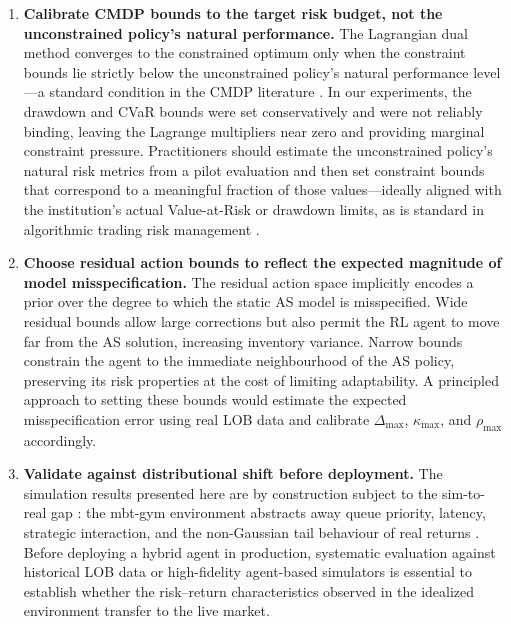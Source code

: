 \documentclass[11pt]{article}
\begin{document}
\begin{enumerate}[leftmargin=*, itemsep=6pt]
  \item \textbf{Calibrate CMDP bounds to the target risk budget, not
    the unconstrained policy's natural performance.}
    The Lagrangian dual method converges to the constrained optimum only
    when the constraint bounds lie strictly below the unconstrained
    policy's natural performance level---a standard condition in the
    CMDP literature \parencite{altschuler2024multi}.
    In our experiments, the drawdown and CVaR bounds were set
    conservatively and were not reliably binding, leaving the Lagrange
    multipliers near zero and providing marginal constraint pressure.
    Practitioners should estimate the unconstrained policy's natural
    risk metrics from a pilot evaluation and then set constraint bounds
    that correspond to a meaningful fraction of those values---ideally
    aligned with the institution's actual Value-at-Risk or drawdown limits,
    as is standard in algorithmic trading risk management
    \parencite{cartea2015execution}.

  \item \textbf{Choose residual action bounds to reflect the expected
    magnitude of model misspecification.}
    The residual action space implicitly encodes a prior over the degree
    to which the static AS model is misspecified.
    Wide residual bounds allow large corrections but also permit the RL
    agent to move far from the AS solution, increasing inventory variance.
    Narrow bounds constrain the agent to the immediate neighbourhood of
    the AS policy, preserving its risk properties at the cost of limiting
    adaptability.
    A principled approach to setting these bounds would estimate the
    expected misspecification error using real LOB data
    \parencite{lobsterdata,lobbench2025} and calibrate $\Delta_{\max}$,
    $\kappa_{\max}$, and $\rho_{\max}$ accordingly.

  \item \textbf{Validate against distributional shift before deployment.}
    The simulation results presented here are by construction subject to
    the sim-to-real gap \parencite{jerome2023mbtgym}: the mbt-gym
    environment abstracts away queue priority, latency, strategic
    interaction, and the non-Gaussian tail behaviour of real returns
    \parencite{bouchaud2018trades,cont2010stochastic}.
    Before deploying a hybrid agent in production, systematic evaluation
    against historical LOB data or high-fidelity agent-based simulators
    \parencite{byrd2019abides} is essential to establish whether the
    risk--return characteristics observed in the idealized environment
    transfer to the live market.
\end{enumerate}
\end{document}
